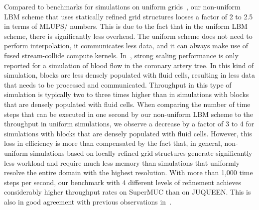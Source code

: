 \documentclass[final,leqno,onefignum,onetabnum]{siamltex1213}
\newcommand{\MLUPSPS}{\mbox{MLUPS/}}
\begin{document}
Compared to benchmarks for simulations on uniform grids~\cite{Godenschwager2013},
our non-uniform LBM scheme that uses statically refined grid structures looses a factor of 2 to 2.5 in terms of \MLUPSPS{} numbers.
This is due to the fact that in the uniform LBM scheme, there is significantly less overhead.
The uniform scheme does not need to perform interpolation, it communicates less data,
and it can always make use of fused stream-collide compute kernels.
In~\cite{Godenschwager2013}, strong scaling performance is only reported for a simulation of blood flow in the coronary artery tree.
In this kind of simulation,
blocks are less densely populated with fluid cells, resulting in less data that needs to be processed and communicated.
Throughput in this type of simulation is typically two to three times higher than in simulations with blocks that are densely populated with fluid cells.
When comparing the number of time steps that can be executed in one second by our non-uniform LBM scheme to the throughput in uniform simulations,
we observe a decrease by a factor of 3 to 4 for simulations with blocks that are densely populated with fluid cells.
However, this loss in efficiency is more than compensated by the fact that,
in general, non-uniform simulations based on locally refined grid structures generate significantly
less workload and require much less memory than simulations that uniformly resolve the entire domain with the highest resolution.
With more than 1,000 time steps per second,
our benchmark with 4 different levels of refinement achieves considerably higher throughput rates on SuperMUC than on JUQUEEN.
This is also in good agreement with previous observations in~\cite{Godenschwager2013}.
\end{document}
